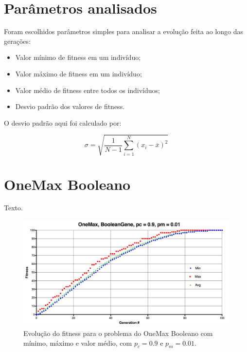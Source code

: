 \label{5_resultados}

\section{Parâmetros analisados}

Foram escolhidos parâmetros simples para analisar a evolução feita ao longo das gerações:

\begin{itemize}
	\item Valor mínimo de fitness em um indivíduo;
	\item Valor máximo de fitness em um indivíduo;
	\item Valor médio de fitness entre todos os indivíduos;
	\item Desvio padrão dos valores de fitness.
\end{itemize}

O desvio padrão aqui foi calculado por:

\begin{equation}
	\sigma = \sqrt{\frac{1}{N-1} \sum_{i=1}^N (x_i - \overline{x})^2}
\end{equation}

\section{OneMax Booleano}

Texto.

\begin{figure}[ht!]
    \centering \includegraphics[width=1.0\textwidth]{onemax_boolean.jpg}
    \caption{Evolução do fitness para o problema do OneMax Booleano com mínimo, máximo e valor médio, com $p_c=0.9$ e $p_m=0.01$.}
    \label{fig:onemax_boolean}
\end{figure}

